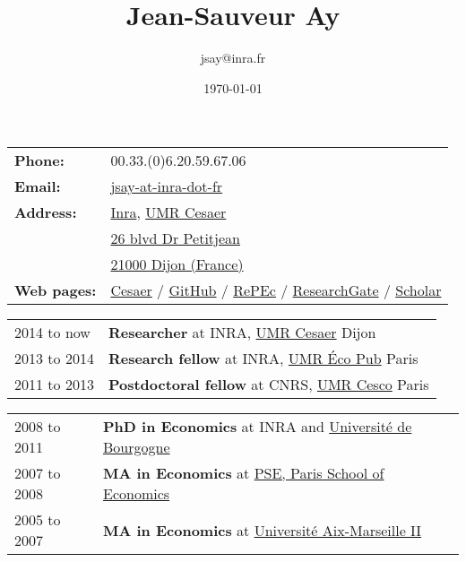 \documentclass[11pt, a4paper]{./style}
\author{jsay@inra.fr}
\date{\today}
\title{Jean-Sauveur Ay}
\begin{document}
\maketitle


\label{sec:orgb95f2e1}

\begin{center}
\begin{tabular}{ll}
\textbf{Phone:} & 00.33.(0)6.20.59.67.06\\
\textbf{Email:} & \href{mailto:jsay@inra.fr}{jsay-at-inra-dot-fr}\\
\textbf{Address:} & \href{http://www.inra.fr/en/Scientists-Students}{Inra}, \href{http://www.dijon.inra.fr/cesaer/en/axis/}{UMR Cesaer}\\
 & \href{https://www.google.com/maps/?q\%3D47.3097819,5.0644835}{26 blvd Dr Petitjean}\\
 & \href{https://www.google.com/maps/place/21000+Dijon/}{21000 Dijon (France)}\\
\textbf{Web pages:} & \href{https://www.dijon.inra.fr/cesaer/membres/jean-sauveur-ay/}{Cesaer} / \href{http://github.com/jsay/}{GitHub} / \href{https://ideas.repec.org/e/pay77.html}{RePEc} / \href{https://www.researchgate.net/profile/Jean\_Sauveur\_Ay}{ResearchGate} / \href{https://scholar.google.fr/citations?user=arEwxlIAAAAJ\&hl=fr}{Scholar}\\
\end{tabular}
\end{center}

\label{sec:orgf8ff43b}

\begin{center}
\begin{tabular}{ll}
2014 to now & \textbf{Researcher} at INRA, \href{http://www.dijon.inra.fr/cesaer/en/axis/}{UMR Cesaer} Dijon\\
2013 to 2014 & \textbf{Research fellow} at INRA, \href{https://www.versailles-grignon.inra.fr/economie\_publique\_eng/}{UMR Éco Pub} Paris\\
2011 to 2013 & \textbf{Postdoctoral fellow} at CNRS, \href{http://cesco.mnhn.fr/en}{UMR Cesco} Paris\\
\end{tabular}
\end{center}

\label{sec:org23d0214}

\begin{center}
\begin{tabular}{ll}
2008 to 2011 & \textbf{PhD in Economics} at INRA and \href{http://en.u-bourgogne.fr/}{Université de Bourgogne}\\
2007 to 2008 & \textbf{MA in Economics} at \href{https://www.parisschoolofeconomics.eu/en/}{PSE, Paris School of Economics}\\
2005 to 2007 & \textbf{MA in Economics} at \href{https://www.amse-aixmarseille.fr/en}{Université Aix-Marseille II}\\
\end{tabular}
\end{center}
\end{document}
